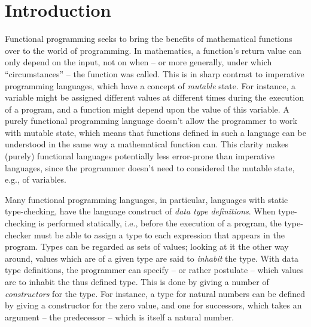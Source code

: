 \chapter{Introduction}

Functional programming seeks to bring the benefits of mathematical functions over to the world of programming. In mathematics, a function's return value can only depend on the input, not on when -- or more generally, under which ``circumstances'' -- the function was called. This is in sharp contrast to imperative programming languages, which have a concept of \textit{mutable} state. For instance, a variable might be assigned different values at different times during the execution of a program, and a function might depend upon the value of this variable. A purely functional programming language doesn't allow the programmer to work with mutable state, which means that functions defined in such a language can be understood in the same way a mathematical function can. This clarity makes (purely) functional languages potentially less error-prone than imperative languages, since the programmer doesn't need to considered the mutable state, e.g., of variables.

Many functional programming languages, in particular, languages with static type-checking, have the language construct of \textit{data type definitions}. When type-checking is performed statically, i.e., before the execution of a program, the type-checker must be able to assign a type to each expression that appears in the program. Types can be regarded as sets of values; looking at it the other way around, values which are of a given type are said to \textit{inhabit} the type. With data type definitions, the programmer can specify -- or rather postulate -- which values are to inhabit the thus defined type. This is done by giving a number of \textit{constructors} for the type. For instance, a type for natural numbers can be defined by giving a constructor for the zero value, and one for successors, which takes an argument -- the predecessor -- which is itself a natural number.


